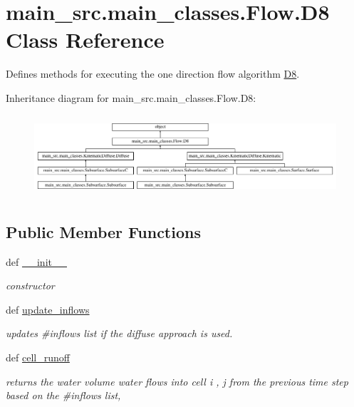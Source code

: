 \hypertarget{classmain__src_1_1main__classes_1_1Flow_1_1D8}{\section{main\-\_\-src.\-main\-\_\-classes.\-Flow.\-D8 Class Reference}
\label{classmain__src_1_1main__classes_1_1Flow_1_1D8}
}


Defines methods for executing the one direction flow algorithm \hyperlink{classmain__src_1_1main__classes_1_1Flow_1_1D8}{D8}.  


Inheritance diagram for main\-\_\-src.\-main\-\_\-classes.\-Flow.\-D8\-:\begin{figure}[H]
\begin{center}
\leavevmode
\includegraphics[height=3.050109cm]{classmain__src_1_1main__classes_1_1Flow_1_1D8}
\end{center}
\end{figure}
\subsection*{Public Member Functions}
\begin{DoxyCompactItemize}
\item 
def \hyperlink{classmain__src_1_1main__classes_1_1Flow_1_1D8_aa434664b8f49810662c7bc460cc92170}{\-\_\-\-\_\-init\-\_\-\-\_\-}
\begin{DoxyCompactList}\small\item\em constructor \end{DoxyCompactList}\item 
def \hyperlink{classmain__src_1_1main__classes_1_1Flow_1_1D8_a964b6a8da5f48f97b65af59977aac7ef}{update\-\_\-inflows}
\begin{DoxyCompactList}\small\item\em updates \#inflows list if the diffuse approach is used. \end{DoxyCompactList}\item 
def \hyperlink{classmain__src_1_1main__classes_1_1Flow_1_1D8_afaa910dba37ffebbd423049421792fbf}{cell\-\_\-runoff}
\begin{DoxyCompactList}\small\item\em returns the water volume water flows into cell i , j from the previous time step based on the \#inflows list, \par
\end{DoxyCompactList}\end{DoxyCompactItemize}
